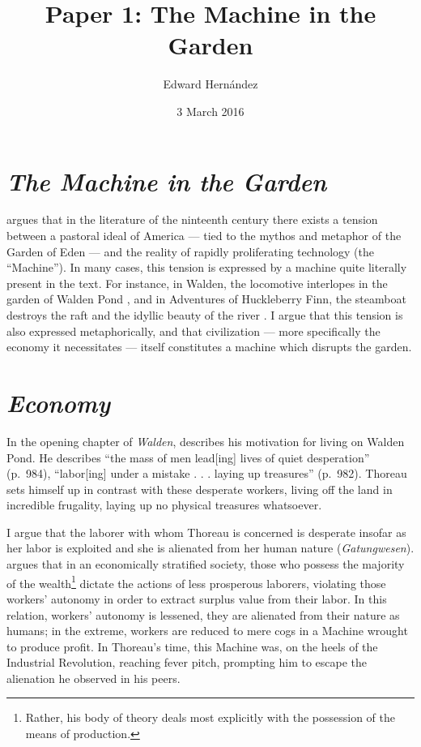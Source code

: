 \documentclass[man,12pt,natbib]{apa6}
\begin{document}
\title{Paper 1: The Machine in the Garden}
\author{Edward Hern\'{a}ndez}
\date{3 March 2016}
\maketitle

\section{\emph{The Machine in the Garden}}

\citet{Marx64} argues that in the literature of the ninteenth century there
exists a tension between a pastoral ideal of America --- tied to the mythos and
metaphor of the Garden of Eden --- and the reality of rapidly proliferating
technology (the ``Machine''). In many cases, this tension is expressed by a
machine quite literally present in the text. For instance, in Walden, the
locomotive interlopes in the garden of Walden Pond \citep[ch.~4]{Thoreau12},
and in Adventures of Huckleberry Finn, the steamboat destroys the raft and the
idyllic beauty of the river \citep[ch.~16]{Twain85}.  I argue that this tension
is also expressed metaphorically, and that civilization --- more specifically
the economy it necessitates --- itself constitutes a machine which disrupts the
garden.


\section{\emph{Economy}}

In the opening chapter of \emph{Walden}, \citet{Thoreau12} describes his
motivation for living on Walden Pond. He describes ``the mass of men lead[ing]
lives of quiet desperation'' (p.~984), ``labor[ing] under a mistake . . .
laying up treasures'' (p.~982).
Thoreau sets himself up in contrast with these desperate workers, living off
the land in incredible frugality, laying up no physical treasures whatsoever.

I argue that the laborer with whom Thoreau is concerned is desperate insofar as
her labor is exploited and she is alienated from her human nature
(\emph{Gatungwesen}). \citet{Marx44} argues that in an economically stratified
society, those who possess the majority of the wealth\footnote{Rather, his body
of theory deals most explicitly with the possession of the means of
production.} dictate the actions of less prosperous laborers, violating those
workers' autonomy in order to extract surplus value from their labor. In this
relation, workers' autonomy is lessened, they are alienated from their nature
as humans; in the extreme, workers are reduced to mere cogs in a Machine
wrought to produce profit. In Thoreau's time, this Machine was, on the heels of
the Industrial Revolution, reaching fever pitch, prompting him to escape the
alienation he observed in his peers.
\end{document}

